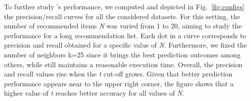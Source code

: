


To further study \TF's performance, we computed and depicted in Fig.~\ref{fig:configs} the precision/recall curves for all the considered datasets. 
For this setting, the number of recommended items \emph{N} was varied from 1 to 20, aiming to study the performance for a long recommendation list. Each dot in a curve corresponds to precision and recall obtained for a specific value of \emph{N}. Furthermore, we fixed the number of neighbors k=25 since it brings the best prediction outcomes among others, while still maintains a reasonable execution time.  
Overall, the precision and recall values rise when the \emph{t} cut-off grows. Given that better prediction performance appears near to the upper right corner, the figure shows that a higher value of \emph{t} reaches better accuracy for all values of \emph{N}.


